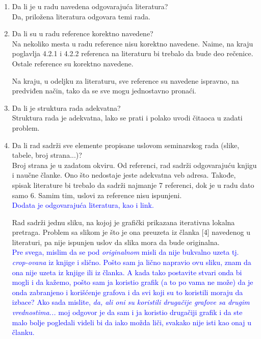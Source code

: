 \documentclass[a4paper]{report}
\newcommand{\odgovor}[1]{\textcolor{blue}{#1}}
\begin{document}
\begin{enumerate}
\item Da li je u radu navedena odgovarajuća literatura?\\
Da, priložena literatura odgovara temi rada.

\item Da li su u radu reference korektno navedene?\\
Na nekoliko mesta u radu reference nisu korektno navedene. Naime, na kraju poglavlja 4.2.1 i 4.2.2 referenca na literaturu bi trebalo da bude deo rečenice. Ostale reference su korektno navedene. 

Na kraju, u odeljku za literaturu, sve reference su navedene ispravno, na predviđen način, tako da se sve mogu jednostavno pronaći.

\item Da li je struktura rada adekvatna?\\
Struktura rada je adekvatna, lako se prati i polako uvodi čitaoca u zadati problem.

\item Da li rad sadrži sve elemente propisane uslovom seminarskog rada (slike, tabele, broj strana...)?\\
Broj strana je u zadatom okviru. Od referenci, rad sadrži odgovarajuću knjigu i naučne članke. Ono što nedostaje jeste adekvatna veb adresa. Takođe, spisak literature bi trebalo da sadrži najmanje 7 referenci, dok je u radu dato samo 6. Samim tim, uslovi za reference nisu ispunjeni.\\
\odgovor{Dodata je odgovarajuća literatura, kao i link.}

Rad sadrži jednu sliku, na kojoj je grafički prikazana iterativna lokalna pretraga. Problem sa slikom je što je ona preuzeta iz članka [4] navedenog u literaturi, pa nije ispunjen uslov da slika mora da bude originalna.\\
\odgovor{Pre svega, mislim da se pod \textit{originalnom} misli da nije bukvalno uzeta tj. \textit{crop-ovana} iz knjige i slično. Pošto sam ja lično napravio ovu sliku, znam da ona nije uzeta iz knjige ili iz članka. A kada tako postavite stvari onda bi mogli i da kažemo, pošto sam ja koristio grafik (a to po vama ne može) da je onda zabranjeno i korišćenje grafova i da svi koji su to koristili moraju da izbace? Ako sada mislite, \textit{da, ali oni su koristili drugačije grafove sa drugim vrednostima...} moj odgovor je da sam i ja koristio drugačiji grafik i da ste malo bolje pogledali videli bi da iako možda liči, svakako nije isti kao onaj u članku.\\ }


\end{enumerate}
\end{document}
